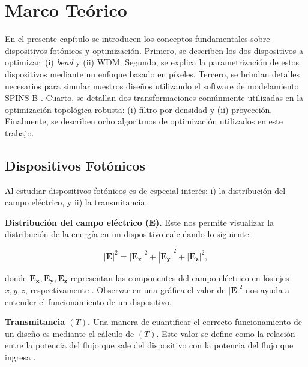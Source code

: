 \chapter{Marco  Teórico}\label{chapter:theory}


En el presente capítulo se introducen los conceptos fundamentales sobre dispositivos fotónicos y optimización. Primero, se describen los dos dispositivos a optimizar: (i) \emph{bend} y (ii) WDM.
Segundo, se explica la parametrización de estos dispositivos mediante un enfoque basado en píxeles.
Tercero, se brindan detalles necesarios para simular nuestros diseños utilizando el software de modelamiento SPINS-B \citep{Su2020}.
Cuarto, se detallan dos transformaciones comúnmente utilizadas en la optimización topológica robusta: 
(i) filtro por densidad y (ii) proyección.
Finalmente, se describen ocho algoritmos de optimización utilizados en este trabajo.

\section{Dispositivos Fotónicos}

Al estudiar dispositivos fotónicos es de especial interés: i) la
distribución del campo eléctrico, y ii) la transmitancia.

\noindent\textbf{Distribución del campo eléctrico ($\boldsymbol{E}$).} Este nos permite visualizar la distribución de la energía en un dispositivo calculando lo siguiente:

\begin{equation}
  |\boldsymbol{E}|^2 = |\boldsymbol{E_x}|^2+|\boldsymbol{E_y}|^2+|\boldsymbol{E_z}|^2,
\label{eq:field}
\end{equation}

\noindent donde $\boldsymbol{E_x}, \boldsymbol{E_y}, \boldsymbol{E_z}$ representan las componentes del campo eléctrico
en los ejes $x, y, z$, respectivamente
\citep{LukasChrostowski2010}. Observar en una gráfica el valor de $|\boldsymbol{E}|^2$ nos ayuda a entender el funcionamiento de un dispositivo.

\noindent \textbf{Transmitancia $(T)$.} Una manera de cuantificar el correcto funcionamiento de un diseño es mediante el cálculo de $(T)$.
Este valor se define como la relación entre la potencia del flujo que sale del dispositivo con la 
potencia del flujo que ingresa \citep{Christiansen2021}.

